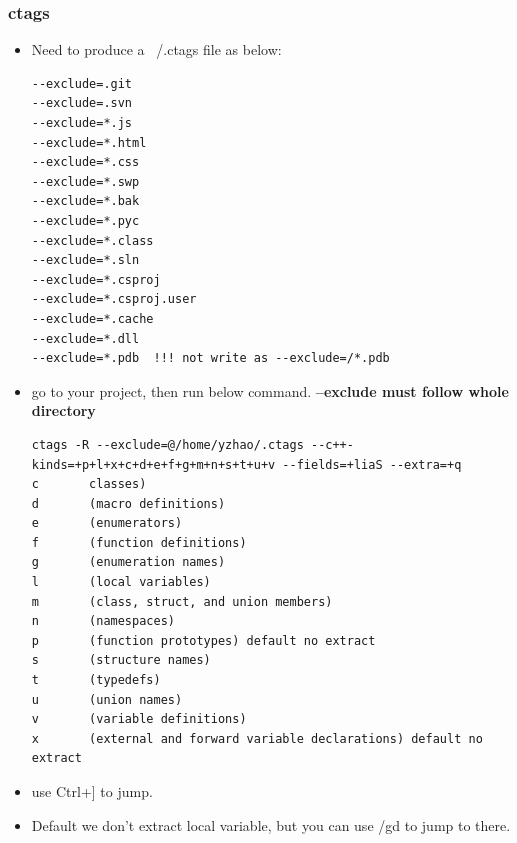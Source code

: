 \documentclass[a4paper,11pt,twoside]{book}
\begin{document}
\subsubsection{ctags}
\begin{itemize}
	\item Need to produce a ~/.ctags file as below: 
	\begin{verbatim}
--exclude=.git
--exclude=.svn
--exclude=*.js
--exclude=*.html
--exclude=*.css
--exclude=*.swp
--exclude=*.bak
--exclude=*.pyc
--exclude=*.class
--exclude=*.sln
--exclude=*.csproj
--exclude=*.csproj.user
--exclude=*.cache
--exclude=*.dll
--exclude=*.pdb	 !!! not write as --exclude=/*.pdb
	\end{verbatim}

	\item go to your project, then run below command. \textbf{--exclude must follow whole directory}
\begin{verbatim}
ctags -R --exclude=@/home/yzhao/.ctags --c++-kinds=+p+l+x+c+d+e+f+g+m+n+s+t+u+v --fields=+liaS --extra=+q
c       classes)
d       (macro definitions)
e       (enumerators)
f       (function definitions)
g       (enumeration names)
l       (local variables) 
m       (class, struct, and union members)
n       (namespaces)
p       (function prototypes) default no extract
s       (structure names)
t       (typedefs)
u       (union names)
v       (variable definitions)
x       (external and forward variable declarations) default no extract
\end{verbatim}
	\item use Ctrl+] to jump. 
	\item Default we don't extract local variable, but you can use /gd to jump to there.

\end{itemize}
\end{document}
